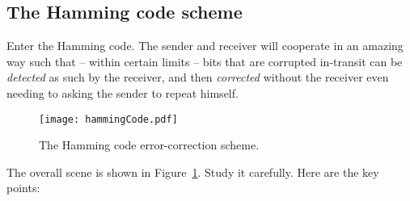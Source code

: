 \subsection{The Hamming code scheme}

Enter the Hamming code. The sender and receiver will cooperate in an amazing
way such that -- within certain limits -- bits that are corrupted in-transit
can be \textit{detected} as such by the receiver, and then \textit{corrected}
without the receiver even needing to asking the sender to repeat himself.

\begin{figure}[ht]
\centering
\texttt{[image: hammingCode.pdf]}
\vspace{-.4in}
\caption{The Hamming code error-correction scheme.}
\label{fig:hammingCode}
\end{figure}
\smallskip

The overall scene is shown in Figure~\ref{fig:hammingCode}. Study it carefully.
Here are the key points:

